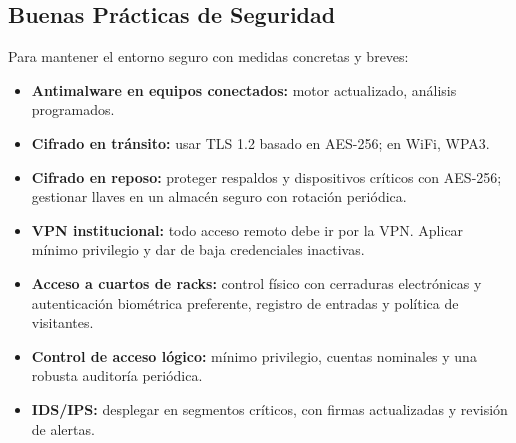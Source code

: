 \subsection{Buenas Prácticas de Seguridad}

Para mantener el entorno seguro con medidas concretas y breves:

\begin{itemize}
    \item \textbf{Antimalware en equipos conectados:} motor actualizado, análisis programados.
    \item \textbf{Cifrado en tránsito:} usar TLS 1.2 basado en AES-256; en WiFi, WPA3. 
    \item \textbf{Cifrado en reposo:} proteger respaldos y dispositivos críticos con AES-256; gestionar llaves en un almacén seguro con rotación periódica.
    \item \textbf{VPN institucional:} todo acceso remoto debe ir por la VPN. Aplicar mínimo privilegio y dar de baja credenciales inactivas.
    \item \textbf{Acceso a cuartos de racks:} control físico con cerraduras electrónicas y autenticación biométrica preferente, registro de entradas y política de visitantes.
    \item \textbf{Control de acceso lógico:} mínimo privilegio, cuentas nominales y una robusta auditoría periódica.
    \item \textbf{IDS/IPS:} desplegar en segmentos críticos, con firmas actualizadas y revisión de alertas.
\end{itemize}
